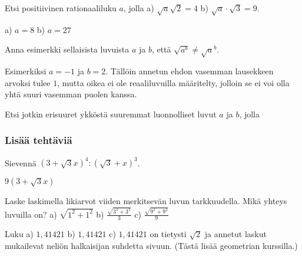 \begin{tehtavasivu}
\begin{tehtava} Etsi positiivinen rationaaliluku $a$, jolla
a) $\sqrt{a} \sqrt{2} = 4$  \quad b)   $ \sqrt{a}\cdot{\sqrt{3}} =9 $.   \quad 
\begin{vastaus}
a) $a=8$ \quad b) $a=27$ \quad 
\end{vastaus}
\end{tehtava}

\begin{tehtava}
Anna esimerkki sellaisista luvuista $a$ ja $b$, että $\sqrt{a^b}\neq {\sqrt{a}}^b$.
	\begin{vastaus}
	Esimerkiksi $a=-1$ ja $b=2$. Tällöin annetun ehdon vasemman lausekkeen arvoksi tulee $1$, mutta oikea ei ole reaaliluvuilla määritelty, jolloin se ei voi olla yhtä suuri vasemman puolen kanssa.
	\end{vastaus}
\end{tehtava}

\begin{tehtava} Etsi jotkin erisuuret ykköstä suuremmat luonnolliset luvut $a$ ja $b$, jolla
\begin{vastaus}
\end{vastaus}
\end{tehtava}

\subsubsection*{Lisää tehtäviä}

\begin{tehtava}
Sievennä $(3+\sqrt{3}x)^4:(\sqrt{3}+x)^3$.
\begin{vastaus}
$9(3 + \sqrt{3}x)$
\end{vastaus}
\end{tehtava}

\begin{tehtava} Laske laskimella likiarvot viiden merkitsevän luvun tarkkuudella. Mikä yhteys luvuilla on?
a) $ \sqrt{1^2+1^2}$ \quad b)  $ \frac {\sqrt{3^2+3^2}}{3}$    \quad c)  $ \frac {\sqrt{9^2+9^2}}{9}$  \quad 
\begin{vastaus}
Luku a) $1,41421$ \quad b) $1,41421$ \quad c) $1,41421$ on tietysti $\sqrt{2}$ ja annetut laskut mukailevat neliön halkaisijan suhdetta sivuun. (Tästä lisää geometrian kurssilla.) %
\end{vastaus}
\end{tehtava}


\end{tehtavasivu}
